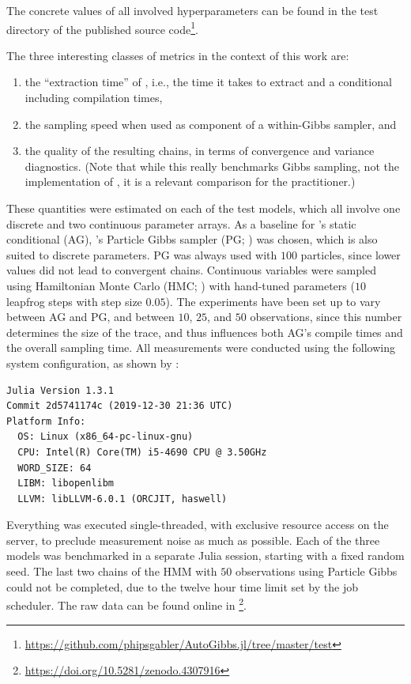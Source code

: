 The concrete values of all involved hyperparameters can be found in the test directory of the
published source
code\footnote{\protect\href{https://github.com/phipsgabler/AutoGibbs.jl/tree/2b433f8f5c37a55f63fbf175193130b46c8b569f/test}{https://github.com/phipsgabler/AutoGibbs.jl/tree/master/test}}.

The three interesting classes of metrics in the context of this work are:
\begin{enumerate}
  \firmlist
\item the \enquote{extraction time} of \autogibbsjl{}, i.e., the time it takes to extract and a
  conditional including compilation times,
\item the sampling speed when used as component of a within-Gibbs sampler, and
\item the quality of the resulting chains, in terms of convergence and variance diagnostics.  (Note
  that while this really benchmarks Gibbs sampling, not the implementation of \autogibbsjl{}, it is
  a relevant comparison for the practitioner.)
\end{enumerate}
These quantities were estimated on each of the test models, which all involve one discrete and two
continuous parameter arrays.  As a baseline for \autogibbsjl{}'s static conditional (AG),
\turingjl{}'s Particle Gibbs sampler (PG; \textcite[see]{andrieu2010particlea}) was chosen, which is
also suited to discrete parameters.  PG was always used with \(100\) particles, since lower values
did not lead to convergent chains.  Continuous variables were sampled using Hamiltonian Monte Carlo
(HMC; \textcite[see]{betancourt2018conceptual}) with hand-tuned parameters (\(10\) leapfrog steps
with step size \(0.05\)).  The experiments have been set up to vary between AG and PG, and between
\(10\), \(25\), and \(50\) observations, since this number determines the size of the trace, and
thus influences both AG's compile times and the overall sampling time.  All measurements were
conducted using the following system configuration, as shown by
:
\begin{lstlisting}
Julia Version 1.3.1
Commit 2d5741174c (2019-12-30 21:36 UTC)
Platform Info:
  OS: Linux (x86_64-pc-linux-gnu)
  CPU: Intel(R) Core(TM) i5-4690 CPU @ 3.50GHz
  WORD_SIZE: 64
  LIBM: libopenlibm
  LLVM: libLLVM-6.0.1 (ORCJIT, haswell)
\end{lstlisting}
Everything was executed single-threaded, with exclusive resource access on the server, to preclude
measurement noise as much as possible.  Each of the three models was benchmarked in a separate Julia
session, starting with a fixed random seed.  The last two chains of the HMM with \(50\) observations
using Particle Gibbs could not be completed, due to the twelve hour time limit set by the job
scheduler.  The raw data can be found online in
\textcite{gabler2020mcmc}\footnote{\protect\url{https://doi.org/10.5281/zenodo.4307916}}.

